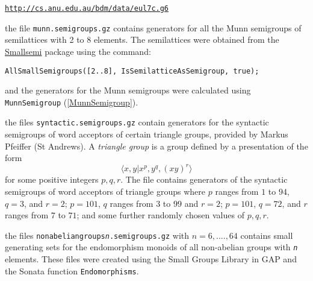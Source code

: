 \documentclass[a4paper,11pt]{report}
\begin{document}
{{\begin{description}
 \href{http://cs.anu.edu.au/~bdm/data/eul7c.g6} {\texttt{http://cs.anu.edu.au/\texttt{}bdm/data/eul7c.g6}} 
\item[{Munn semigroups}]  the file \texttt{munn.semigroups.gz} contains generators for all the Munn semigroups of semilattices with 2 to 8
elements. The semilattices were obtained from the \href{http://www-history.mcs.st-and.ac.uk/~jamesm/smallsemi.php} {Smallsemi} package using the command: 
\begin{Verbatim}[commandchars=!@|,fontsize=\small,frame=single,label=Example]
  AllSmallSemigroups([2..8], IsSemilatticeAsSemigroup, true);
\end{Verbatim}
 and the generators for the Munn semigroups were calculated using \texttt{MunnSemigroup} (\ref{MunnSemigroup}). 
\item[{Syntactic semigroups}]  the files \texttt{syntactic.semigroups.gz} contain generators for the syntactic semigroups of word acceptors of certain
triangle groups, provided by Markus Pfeiffer (St Andrews). A \emph{triangle group} is a group defined by a presentation of the form 
\[ \langle x, y | x^p, y^q, (xy)^r\rangle \]
 for some positive integers $p, q, r$. The file contains generators of the syntactic semigroups of word acceptors
of triangle groups where $p$ ranges from $1$ to $94$, $q=3$, and $r=2$; $p=101$, $q$ ranges from $3$ to $99$ and $r=2$; $p=101$, $q=72$, and $r$ ranges from $7$ to $71$; and some further randomly chosen values of $p,q,r$. 
\item[{Endomorphisms of groups}]  the files \texttt{nonabelian{\textunderscore}groups{\textunderscore}\mbox{\texttt{\mdseries\slshape n}}.semigroups.gz} with $n=6,....,64$ contains small generating sets for the endomorphism monoids of all non-abelian
groups with \mbox{\texttt{\mdseries\slshape n}} elements. These files were created using the Small Groups Library in \textsf{GAP} and the \textsf{Sonata} function \texttt{Endomorphisms}. 
\end{description}
 }

 }

 
\end{document}
